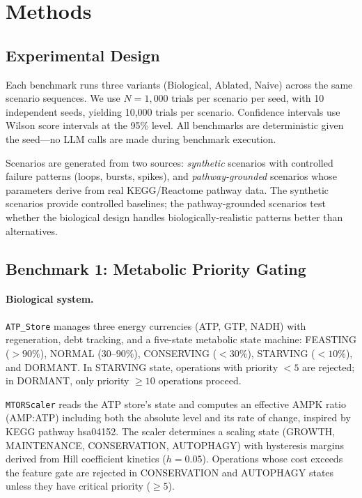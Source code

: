 \section{Methods}\label{sec:methods}

\subsection{Experimental Design}

Each benchmark runs three variants (Biological, Ablated, Naive) across
the same scenario sequences.  We use $N = 1{,}000$ trials per scenario
per seed, with 10 independent seeds, yielding 10{,}000 trials per
scenario.  Confidence intervals use Wilson score intervals at the 95\%
level.  All benchmarks are deterministic given the seed---no LLM calls
are made during benchmark execution.

Scenarios are generated from two sources: \emph{synthetic} scenarios
with controlled failure patterns (loops, bursts, spikes), and
\emph{pathway-grounded} scenarios whose parameters derive from real
KEGG/Reactome pathway data.  The synthetic scenarios provide controlled
baselines; the pathway-grounded scenarios test whether the biological
design handles biologically-realistic patterns better than alternatives.

\subsection{Benchmark 1: Metabolic Priority Gating}

\paragraph{Biological system.}
\texttt{ATP\_Store} manages three energy currencies (ATP, GTP, NADH)
with regeneration, debt tracking, and a five-state metabolic state
machine: FEASTING ($> 90\%$), NORMAL ($30$--$90\%$), CONSERVING
($< 30\%$), STARVING ($< 10\%$), and DORMANT.  In STARVING state,
operations with priority $< 5$ are rejected; in DORMANT, only priority
$\geq 10$ operations proceed.

\texttt{MTORScaler} reads the ATP store's state and computes an
effective AMPK ratio (AMP:ATP) including both the absolute level and
its rate of change, inspired by KEGG pathway hsa04152.  The scaler
determines a scaling state (GROWTH, MAINTENANCE, CONSERVATION,
AUTOPHAGY) with hysteresis margins derived from Hill coefficient
kinetics ($h = 0.05$).  Operations whose cost exceeds the feature
gate are rejected in CONSERVATION and AUTOPHAGY states unless they
have critical priority ($\geq 5$).

